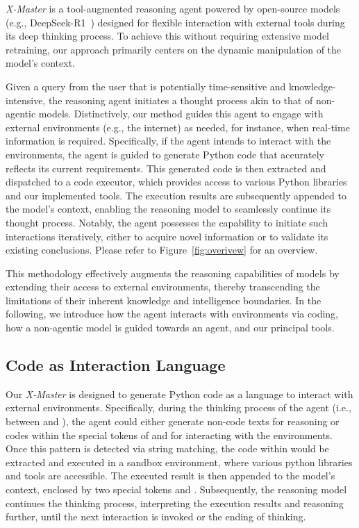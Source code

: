 \documentclass{article}
\newcommand{\textboxStyle}[2]{%
    \tikzmarknode[draw=#1,thick,fill=white,rounded corners=2pt,inner sep=2pt]{boxnode}{#2}%
}
\newcommand{\thinkStart}{\textboxStyle{think_text}{\textbf{\textcolor{think_text}{<think>}}}}
\newcommand{\thinkEnd}{\textboxStyle{think_text}{\textbf{\textcolor{think_text}{</think>}}}}
\newcommand{\resultStart}{\textboxStyle{result_text}{\textbf{\textcolor{result_text}{<execution\_results>}}}}
\newcommand{\resultEnd}{\textboxStyle{result_text}{\textbf{\textcolor{result_text}{</execution\_results>}}}}
\newcommand{\codeStart}{\textboxStyle{code_text}{\textbf{\textcolor{code_text}{<code>}}}}
\newcommand{\codeEnd}{\textboxStyle{code_text}{\textbf{\textcolor{code_text}{</code>}}}}
\begin{document}
\emph{X-Master} is a tool-augmented reasoning agent powered by open-source models (e.g., DeepSeek-R1~\citep{guo2025deepseek}) designed for flexible interaction with external tools during its deep thinking process.
To achieve this without requiring extensive model retraining, our approach primarily centers on the dynamic manipulation of the model's context.

Given a query from the user that is potentially time-sensitive and knowledge-intensive, the reasoning agent initiates a thought process akin to that of non-agentic models.
Distinctively, our method guides this agent to engage with external environments (e.g., the internet) as needed, for instance, when real-time information is required.
Specifically, if the agent intends to interact with the environments, the agent is guided to generate \colorbox{code}{Python code} that accurately reflects its current requirements.
This generated code is then extracted and dispatched to a code executor, which provides access to various Python libraries and our implemented tools.
The \colorbox{result}{execution results} are subsequently appended to the model's context, enabling the reasoning model to seamlessly continue its thought process.
Notably, the agent possesses the capability to initiate such interactions iteratively, either to acquire novel information or to validate its existing conclusions.
Please refer to Figure~\ref{fig:overivew} for an overview.

This methodology effectively augments the reasoning capabilities of models by extending their access to external environments, thereby transcending the limitations of their inherent knowledge and intelligence boundaries.
In the following, we introduce how the agent interacts with environments via coding, how a non-agentic model is guided towards an agent, and our principal tools.

\subsection{Code as Interaction Language}

Our \emph{X-Master} is designed to generate Python code as a language to interact with external environments.
Specifically, during the thinking process of the agent (i.e., between \thinkStart and \thinkEnd), the agent could either generate non-code texts for reasoning or codes within the special tokens of \codeStart and \codeEnd for interacting with the environments.
Once this pattern is detected via string matching, the code within would be extracted and executed in a sandbox environment, where various python libraries and tools are accessible.
The executed result is then appended to the model's context, enclosed by two special tokens \resultStart and \resultEnd.
Subsequently, the reasoning model continues the thinking process, interpreting the execution results and reasoning further, until the next interaction is invoked or the ending of thinking.
\end{document}
